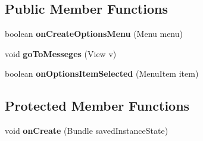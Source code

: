 \subsection*{Public Member Functions}
\begin{DoxyCompactItemize}
\item 
boolean {\bfseries on\+Create\+Options\+Menu} (Menu menu)\hypertarget{classcom_1_1example_1_1sebastian_1_1tindertp_1_1InfomationActivity_aedbe86e416c8e9794e9e3e908f78d393}{}\label{classcom_1_1example_1_1sebastian_1_1tindertp_1_1InfomationActivity_aedbe86e416c8e9794e9e3e908f78d393}

\item 
void {\bfseries go\+To\+Messeges} (View v)\hypertarget{classcom_1_1example_1_1sebastian_1_1tindertp_1_1InfomationActivity_a6b267eda4540054394f78638f6be1d45}{}\label{classcom_1_1example_1_1sebastian_1_1tindertp_1_1InfomationActivity_a6b267eda4540054394f78638f6be1d45}

\item 
boolean {\bfseries on\+Options\+Item\+Selected} (Menu\+Item item)\hypertarget{classcom_1_1example_1_1sebastian_1_1tindertp_1_1InfomationActivity_ab5ea063b8ca5d8754bbc0cb3b769257d}{}\label{classcom_1_1example_1_1sebastian_1_1tindertp_1_1InfomationActivity_ab5ea063b8ca5d8754bbc0cb3b769257d}

\end{DoxyCompactItemize}
\subsection*{Protected Member Functions}
\begin{DoxyCompactItemize}
\item 
void {\bfseries on\+Create} (Bundle saved\+Instance\+State)\hypertarget{classcom_1_1example_1_1sebastian_1_1tindertp_1_1InfomationActivity_ac8b37892625d557aeb1b373863a2ca1e}{}\label{classcom_1_1example_1_1sebastian_1_1tindertp_1_1InfomationActivity_ac8b37892625d557aeb1b373863a2ca1e}

\end{DoxyCompactItemize}
